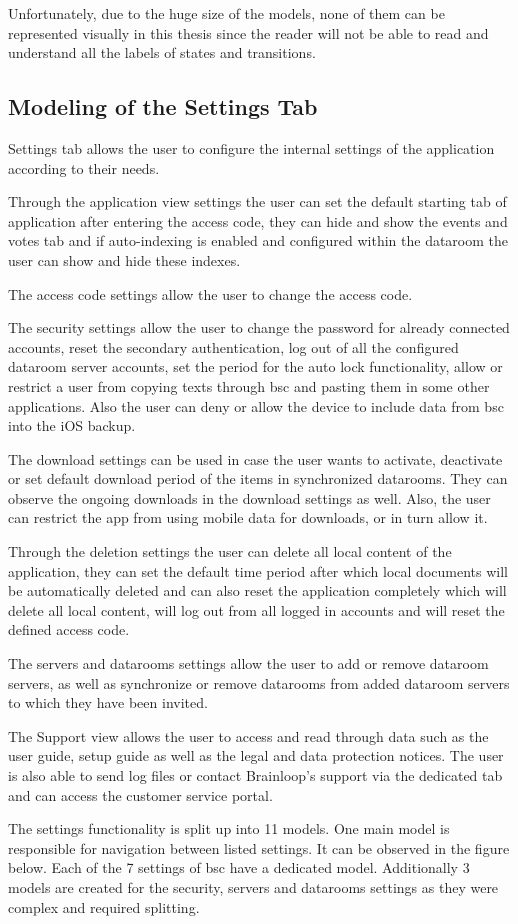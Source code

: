 \par
Unfortunately, due to the huge size of the models, none of them can be represented visually in this thesis since the reader will not be able to read and understand all the labels of states and transitions.

\subsection{Modeling of the Settings Tab}
\par
Settings tab allows the user to configure the internal settings of the application according to their needs. 
\par
Through the application view settings the user can set the default starting tab of application after entering the access code, they can hide and show the events and votes tab and if auto-indexing is enabled and configured within the dataroom the user can show and hide these indexes. 
\par
The access code settings allow the user to change the access code.
\par
The security settings allow the user to change the password for already connected accounts, reset the secondary authentication, log out of all the configured dataroom server accounts, set the period for the auto lock functionality, allow or restrict a user from copying texts through \acrshort{bsc} and pasting them in some other applications. Also the user can deny or allow the device to include data from \acrshort{bsc} into the iOS backup. 
\par
The download settings can be used in case the user wants to activate, deactivate or set default download period of the items in synchronized datarooms. They can observe the ongoing downloads in the download settings as well. Also, the user can restrict the app from using mobile data for downloads, or in turn allow it. 
\par
Through the deletion settings the user can delete all local content of the application, they can set the default time period after which local documents will be automatically deleted and can also reset the application completely which will delete all local content, will log out from all logged in accounts and will reset the defined access code.
\par
The servers and datarooms settings allow the user to add or remove dataroom servers, as well as synchronize or remove datarooms from added dataroom servers to which they have been invited.
\par
The Support view allows the user to access and read through data such as the user guide, setup guide as well as the legal and data protection notices. The user is also able to send log files or contact Brainloop's support via the dedicated tab and can access the customer service portal.
\par
The settings functionality is split up into 11 models. One main model is responsible for navigation between listed settings. It can be observed in the figure below. Each of the 7 settings of \acrshort{bsc} have a dedicated model. Additionally 3 models are created for the security, servers and datarooms settings as they were complex and required splitting.

